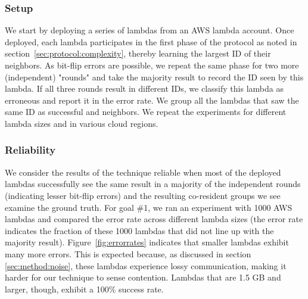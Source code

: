 \subsubsection{Setup}
\label{subsec:expsetup}
We start by deploying a series of lambdas from an AWS lambda account.  Once
deployed, each lambda participates in the first phase of the protocol as noted
in section~\ref{sec:protocol:complexity}, thereby learning the largest ID of
their neighbors. As bit-flip errors are possible, we repeat the same phase for
two more (independent) "rounds" and take the majority result to record the ID
seen by this lambda.  If all three rounds result in different IDs, we classify
this lambda as erroneous and report it in the error rate. We group all the
lambdas that saw the same ID as successful and neighbors. We repeat the
experiments for different lambda sizes and in various cloud regions.

\subsubsection{Reliability}
We consider the results of the technique reliable when most of the deployed
lambdas successfully see the same result in a majority of the independent rounds
(indicating lesser bit-flip errors) and the resulting co-resident groups we
see examine the ground truth.  For goal \#1, we ran an experiment with 1000 AWS
lambdas and compared the error rate across different lambda sizes (the error
rate indicates the fraction of these 1000 lambdas that did not line up with the majority
result). Figure~\ref{fig:errorrates} indicates that smaller lambdas exhibit many
more errors.  This is expected because, as discussed in section
\ref{sec:method:noise}, these lambdas experience lossy communication, making it
harder for our technique to sense contention. Lambdas that are 1.5 GB and
larger, though, exhibit a 100\% success rate.

